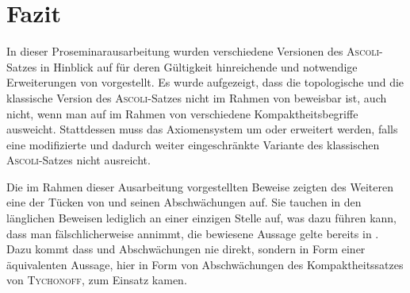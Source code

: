 \chapter{Fazit}

In dieser Proseminarausarbeitung wurden verschiedene Versionen des \textsc{Ascoli}\hyp{}Satzes in Hinblick auf für deren Gültigkeit hinreichende und notwendige Erweiterungen von \ZF vorgestellt.
Es wurde aufgezeigt, dass die topologische und die klassische Version des \textsc{Ascoli}\hyp{}Satzes nicht im Rahmen von \ZF beweisbar ist, auch nicht, wenn man auf im Rahmen von \ZF verschiedene Kompaktheitsbegriffe ausweicht.
Stattdessen muss das Axiomensystem um \PIT oder \CCR erweitert werden, falls eine modifizierte und dadurch weiter eingeschränkte Variante des klassischen \textsc{Ascoli}\hyp{}Satzes nicht ausreicht.

Die im Rahmen dieser Ausarbeitung vorgestellten Beweise zeigten des Weiteren eine der Tücken von \AC und seinen Abschwächungen auf. Sie tauchen in den länglichen Beweisen lediglich an einer einzigen Stelle auf, was dazu führen kann, dass man fälschlicherweise annimmt, die bewiesene Aussage gelte bereits in \ZF. Dazu kommt dass \AC und Abschwächungen nie direkt, sondern in Form einer äquivalenten Aussage, hier in Form von Abschwächungen des Kompaktheitssatzes von \textsc{Tychonoff}, zum Einsatz kamen.
